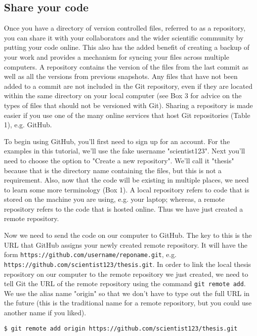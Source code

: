 \subsection{Share your code}

Once you have a directory of version controlled files, referred to as a repository, you can share it with your collaborators and the wider scientific community by putting your code online.
This also has the added benefit of creating a backup of your work and provides a mechanism for syncing your files across multiple computers.
A repository contains the version of the files from the last commit as well as all the versions from previous snapshots.
Any files that have not been added to a commit are not included in the Git repository, even if they are located within the same directory on your local computer (see Box 3 for advice on the types of files that should not be versioned with Git).
Sharing a repository is made easier if you use one of the many online services that host Git repositories (Table 1), e.g. GitHub.

To begin using GitHub, you'll first need to sign up for an account.
For the examples in this tutorial, we'll use the fake username "scientist123".
Next you'll need to choose the option to "Create a new repository".
We'll call it "thesis" because that is the directory name containing the files, but this is not a requirement.
Also, now that the code will be existing in multiple places, we need to learn some more terminology (Box 1).
A local repository refers to code that is stored on the machine you are using, e.g. your laptop; whereas, a remote repository refers to the code that is hosted online.
Thus we have just created a remote repository.

Now we need to send the code on our computer to GitHub.
The key to this is the URL that GitHub assigns your newly created remote repository.
It will have the form \verb|https://github.com/username/reponame.git|, e.g. \verb|https://github.com/scientist123/thesis.git|.
In order to link the local thesis repository on our computer to the remote repository we just created, we need to tell Git the URL of the remote repository using the command \verb|git remote add|.
We use the alias name "origin" so that we don't have to type out the full URL in the future (this is the traditional name for a remote repository, but you could use another name if you liked).

\begin{lstlisting}
$ git remote add origin https://github.com/scientist123/thesis.git
\end{lstlisting}

